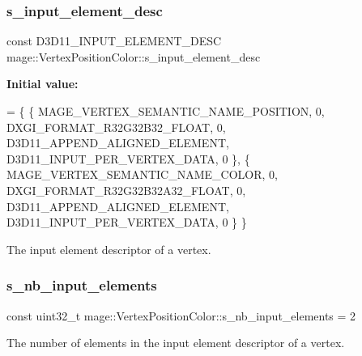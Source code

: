 \subsubsection{\texorpdfstring{s\+\_\+input\+\_\+element\+\_\+desc}{s\_input\_element\_desc}}
{\footnotesize\ttfamily const D3\+D11\+\_\+\+I\+N\+P\+U\+T\+\_\+\+E\+L\+E\+M\+E\+N\+T\+\_\+\+D\+E\+SC mage\+::\+Vertex\+Position\+Color\+::s\+\_\+input\+\_\+element\+\_\+desc\hspace{0.3cm}{\ttfamily [static]}}

{\bfseries Initial value\+:}
\begin{DoxyCode}
= \{
        \{ MAGE\_VERTEX\_SEMANTIC\_NAME\_POSITION, 0, DXGI\_FORMAT\_R32G32B32\_FLOAT,    0, 
      D3D11\_APPEND\_ALIGNED\_ELEMENT, D3D11\_INPUT\_PER\_VERTEX\_DATA, 0 \},
        \{ MAGE\_VERTEX\_SEMANTIC\_NAME\_COLOR,    0, DXGI\_FORMAT\_R32G32B32A32\_FLOAT, 0, 
      D3D11\_APPEND\_ALIGNED\_ELEMENT, D3D11\_INPUT\_PER\_VERTEX\_DATA, 0 \}
    \}
\end{DoxyCode}
The input element descriptor of a vertex. \hypertarget{structmage_1_1_vertex_position_color_a480c2767efdb73c09ebf55313e4b29c9}{}\label{structmage_1_1_vertex_position_color_a480c2767efdb73c09ebf55313e4b29c9} 
\subsubsection{\texorpdfstring{s\+\_\+nb\+\_\+input\+\_\+elements}{s\_nb\_input\_elements}}
{\footnotesize\ttfamily const uint32\+\_\+t mage\+::\+Vertex\+Position\+Color\+::s\+\_\+nb\+\_\+input\+\_\+elements = 2\hspace{0.3cm}{\ttfamily [static]}}

The number of elements in the input element descriptor of a vertex. 